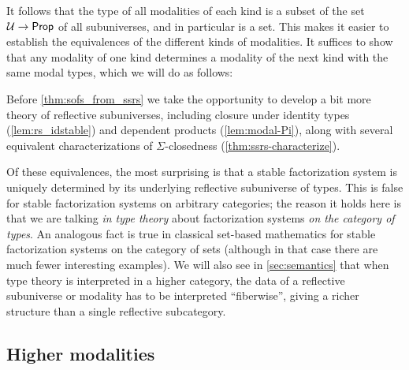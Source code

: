 It follows that the type of all modalities of each
kind is a subset of the set $\mathcal{U}\to\mathsf{Prop}$ of all subuniverses, and in particular is a set.
This makes it easier to establish
the equivalences of the different kinds of modalities.
It suffices
to show that any modality of one kind determines a modality of the next kind
with the same modal types, which we will do as follows:
\begin{center}
\end{center}
Before \autoref{thm:sofs_from_ssrs} we take the opportunity to develop a bit more theory of reflective subuniverses, including closure under identity types (\autoref{lem:rs_idstable}) and dependent products
(\autoref{lem:modal-Pi}), along with several equivalent characterizations of $\Sigma$-closedness (\autoref{thm:ssrs-characterize}).

Of these equivalences, the most surprising is that a stable factorization system is uniquely determined by its underlying reflective subuniverse of types.
This is false for stable factorization systems on arbitrary categories; the reason it holds here is that we are talking \emph{in type theory} about factorization systems \emph{on the category of types}.
An analogous fact is true in classical set-based mathematics for stable factorization systems on the category of sets (although in that case there are much fewer interesting examples).
We will also see in \cref{sec:semantics} that when type theory is interpreted in a higher category, the data of a reflective subuniverse or modality has to be interpreted ``fiberwise'', giving a richer structure than a single reflective subcategory.


\subsection{Higher modalities}
\label{sec:higher-modalities}

